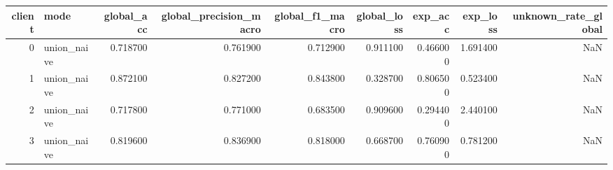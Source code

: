 \begin{tabular}{rlrrrrrrr}
\toprule
client & mode & global_acc & global_precision_macro & global_f1_macro & global_loss & exp_acc & exp_loss & unknown_rate_global \\
\midrule
0 & union_naive & 0.718700 & 0.761900 & 0.712900 & 0.911100 & 0.466000 & 1.691400 & NaN \\
1 & union_naive & 0.872100 & 0.827200 & 0.843800 & 0.328700 & 0.806500 & 0.523400 & NaN \\
2 & union_naive & 0.717800 & 0.771000 & 0.683500 & 0.909600 & 0.294400 & 2.440100 & NaN \\
3 & union_naive & 0.819600 & 0.836900 & 0.818000 & 0.668700 & 0.760900 & 0.781200 & NaN \\
\bottomrule
\end{tabular}
